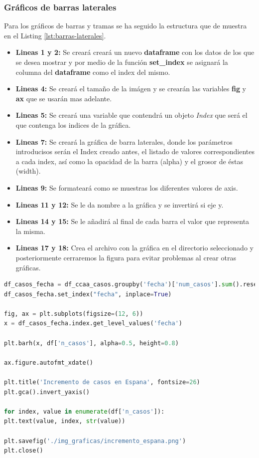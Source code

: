 \subsubsection{Gráficos de barras laterales}

Para los gráficos de barras y tramas se ha seguido la estructura que de muestra en el Listing \ref{lst:barras-laterales}. 

\begin{itemize}
	\item \textbf{Lineas 1 y 2:} Se creará creará un nuevo \textbf{dataframe} con los datos de los que se desea mostrar y por medio de la función \textbf{set\_index} se asignará la columna del \textbf{dataframe} como el index del mismo.
	\item \textbf{Lineas 4:} Se creará el tamaño de la imágen y se crearán las variables \textbf{fig} y \textbf{ax} que se usarán mas adelante.
	\item \textbf{Lineas 5:} Se creará una variable que contendrá un objeto \textit{Index} que será el que contenga los indices de la gráfica.
	\item \textbf{Lineas 7:} Se creará la gráfica de barra laterales, donde los parámetros introducisos serán el Index creado antes, el listado de valores correspondientes a cada index, así como la opacidad de la barra (alpha) y el grosor de éstas (width).
	\item \textbf{Lineas 9:} Se formateará como se muestras los diferentes valores de axis.
	\item \textbf{Lineas 11 y 12:} Se le da nombre a la gráfica y se invertirá si eje y.
	\item \textbf{Lineas 14 y 15:} Se le añadirá al final de cada barra el valor que representa la misma.
	\item \textbf{Lineas 17 y 18:} Crea el archivo con la gráfica en el directorio seleccionado y posteriormente cerraremos la figura para evitar problemas al crear otras gráficas.
\end{itemize}

\begin{lstlisting}[language=Python, caption={Generár gráficos de barras laterales.}, label={lst:barras-laterales}]
df_casos_fecha = df_ccaa_casos.groupby('fecha')['num_casos'].sum().reset_index()
df_casos_fecha.set_index("fecha", inplace=True)

fig, ax = plt.subplots(figsize=(12, 6))
x = df_casos_fecha.index.get_level_values('fecha')

plt.barh(x, df['n_casos'], alpha=0.5, height=0.8)

ax.figure.autofmt_xdate()

plt.title('Incremento de casos en Espana', fontsize=26)
plt.gca().invert_yaxis()

for index, value in enumerate(df['n_casos']):
plt.text(value, index, str(value))

plt.savefig('./img_graficas/incremento_espana.png')
plt.close()
\end{lstlisting}


